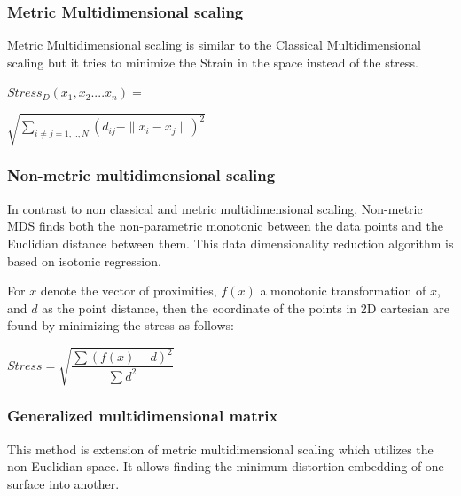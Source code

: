 \documentclass[11pt, a4paper]{article}
\begin{document}
\begin{multicols}{2}
            \subsubsection{Metric Multidimensional scaling}
                Metric Multidimensional scaling is similar to the Classical Multidimensional scaling but it tries to minimize the Strain in the space instead of the stress.
                \begin{flushleft}
                    \begin{math}
                        Stress_{D}(x_{1},x_{2}....x_{n} ) = 
                    \end{math}
                \end{flushleft}
                \begin{flushright}
                    \begin{math}
                        \sqrt{\sum_{i \neq j=1,..,N}\left(d_{ij} - \| x_i - x_j \| \right)^{2}}
                    \end{math}
                \end{flushright}
            \subsubsection{Non-metric multidimensional scaling}
                In contrast to non classical and metric multidimensional scaling, Non-metric MDS finds both the non-parametric monotonic between the data points and the Euclidian distance between them. This data dimensionality reduction algorithm is based on isotonic regression. 

                For \(x\) denote the vector of proximities, \(f(x)\) a monotonic transformation of \(x\), and \(d\) as the point distance, then the coordinate of the points in 2D cartesian are found by minimizing the stress as follows:

                \begin{center}
                    \begin{math}
                        Stress = \sqrt{
                            \dfrac{
                                \sum{\left(f(x) - d\right) ^{2}}
                            } {
                                \sum{d^{2}}
                            }
                        }
                    \end{math}
                \end{center}
            \subsubsection{Generalized multidimensional matrix}
                This method is extension of metric multidimensional scaling which utilizes the non-Euclidian space. It allows finding the minimum-distortion embedding of one surface into another.


\end{multicols}
\end{document}
